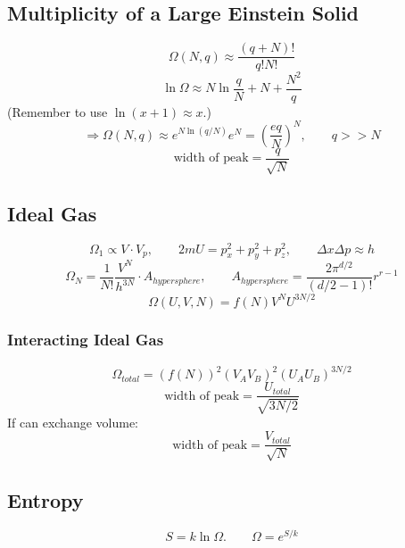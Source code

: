 \documentclass[a4paper,norsk, 10pt]{article}
\begin{document}
\subsection{Multiplicity of a Large Einstein Solid}
\begin{equation}
\Omega(N,q) \approx \frac{(q+N)!}{q!N!}
\end{equation}
\begin{equation}
\ln\Omega \approx N\ln\frac{q}{N} + N + \frac{N^2}{q}
\end{equation}
(Remember to use $\ln(x+1) \approx x$.)
\begin{equation}
\Rightarrow \Omega(N,q) \approx e^{N\ln(q/N)}e^N = \left(\frac{eq}{N}\right)^N,\qquad q >>N
\end{equation}
\begin{equation}
\text{width of peak} = \frac{q}{\sqrt{N}}
\end{equation}
\subsection{Ideal Gas}
\begin{equation}
\Omega_1 \propto V\cdot V_p,\qquad 2mU = p^2_x + p^2_y + p^2_z,\qquad \Delta x \Delta p \approx h 
\end{equation}
\begin{equation}
\Omega_N = \frac{1}{N!}\frac{V^N}{h^{3N}}\cdot A_{hypersphere},\qquad A_{hypersphere} = \frac{2\pi^{d/2}}{(d/2 - 1)!}r^{r-1}
\end{equation}
\begin{equation}
\Omega(U,V,N) = f(N)V^NU^{3N/2}
\end{equation}
\subsubsection{Interacting Ideal Gas}
\begin{equation}
\Omega_{total} = (f(N))^2(V_AV_B)^2(U_AU_B)^{3N/2}
\end{equation}
\begin{equation}
\text{width of peak} = \frac{U_{total}}{\sqrt{3N/2}}
\end{equation}
If can exchange volume:
\begin{equation}
\text{width of peak} = \frac{V_{total}}{\sqrt{N}}
\end{equation}
\subsection{Entropy}
\begin{equation}
S = k\ln\Omega. \qquad \Omega = e^{S/k}
\end{equation}
\end{document}
